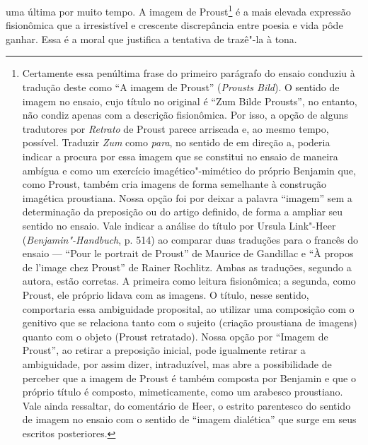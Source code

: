 uma última por muito tempo. A imagem de Proust\footnote{Certamente
  essa penúltima frase do primeiro parágrafo do ensaio conduziu à
  tradução deste como ``A imagem de Proust'' (\emph{Prousts Bild}). O
  sentido de imagem no ensaio, cujo título no original é ``Zum Bilde
  Prousts'', no entanto, não condiz apenas com a descrição fisionômica.
  Por isso, a opção de alguns tradutores por \emph{Retrato} de Proust
  parece arriscada e, ao mesmo tempo, possível. Traduzir \emph{Zum} como
  \emph{para}, no sentido de em direção a, poderia indicar a procura por
  essa imagem que se constitui no ensaio de maneira ambígua e como um
  exercício imagético"-mimético do próprio Benjamin que, como Proust,
  também cria imagens de forma semelhante à construção imagética
  proustiana. Nossa opção foi por deixar a palavra ``imagem'' sem a
  determinação da preposição ou do artigo definido, de forma a ampliar
  seu sentido no ensaio. Vale indicar a análise do título por Ursula
  Link"-Heer (\emph{Benjamin"-Handbuch}, p. 514) ao comparar duas traduções
  para o francês do ensaio --- ``Pour le portrait de Proust'' de
  Maurice de Gandillac e ``À propos de l'image chez Proust'' de
  Rainer Rochlitz. Ambas as traduções, segundo a autora, estão corretas.
  A primeira como leitura fisionômica; a segunda, como Proust, ele
  próprio lidava com as imagens. O título, nesse sentido, comportaria
  essa ambiguidade proposital, ao utilizar uma composição com o genitivo
  que se relaciona tanto com o sujeito (criação proustiana de imagens)
  quanto com o objeto (Proust retratado). Nossa opção por ``Imagem de
  Proust'', ao retirar a preposição inicial, pode igualmente retirar a
  ambiguidade, por assim dizer, intraduzível, mas abre a possibilidade
  de perceber que a imagem de Proust é também composta por Benjamin e
  que o próprio título é composto, mimeticamente, como um arabesco
  proustiano. Vale ainda ressaltar, do comentário de Heer, o estrito
  parentesco do sentido de imagem no ensaio com o sentido de ``imagem
  dialética'' que surge em seus escritos posteriores. \versal{[N.~T.]}} é a mais elevada
expressão fisionômica que a irresistível e crescente discrepância entre
poesia e vida pôde ganhar. Essa é a moral que justifica a tentativa de
trazê"-la à tona.

